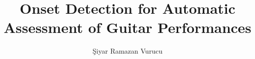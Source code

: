 \documentclass[a4paper,12pt,twoside]{report}
\begin{document}

\title{Onset Detection for Automatic Assessment of Guitar Performances}
\author{Şiyar Ramazan Vurucu}


\maketitle
\makeendtitle
\restoregeometry

\preface
\cleardoublepage 



\body











\listoffigures
\newpage
\listoftables





\end{document}
